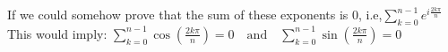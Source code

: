 \documentclass[preview]{standalone}
\begin{document}
\begin{center}
If we could somehow prove that the sum of these exponents is 0, i.e,$\sum_{k=0}^{n-1}e^{i\frac{2k\pi}{n}}$This would imply: $\sum_{k=0}^{n-1} \cos\left(\frac{2k\pi}{n}\right) = 0 \quad \text{and} \quad \sum_{k=0}^{n-1} \sin\left(\frac{2k\pi}{n}\right) = 0$
\end{center}
\end{document}
